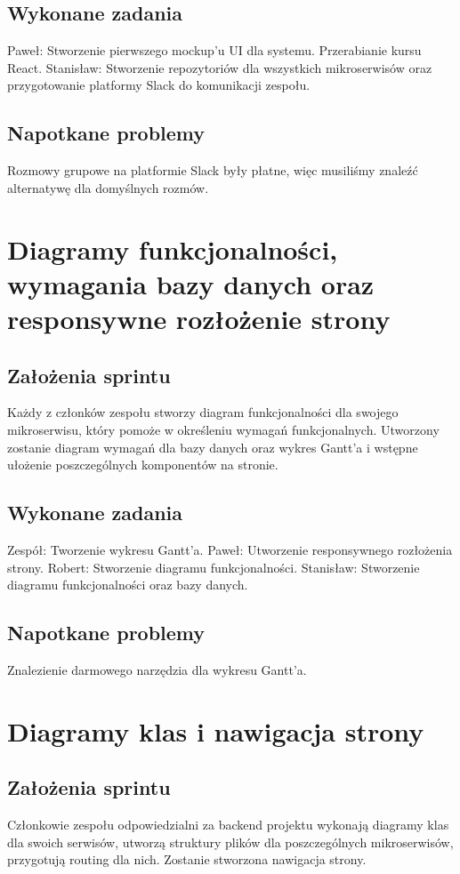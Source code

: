 \documentclass[a4paper,11pt]{report}
\begin{document}
\subsection {Wykonane zadania}
Paweł: Stworzenie pierwszego mockup'u UI dla systemu. Przerabianie kursu React. 
Stanisław: Stworzenie repozytoriów dla wszystkich mikroserwisów oraz przygotowanie platformy Slack do komunikacji zespołu.
\subsection {Napotkane problemy}
Rozmowy grupowe na platformie Slack były płatne, więc musiliśmy znaleźć alternatywę dla domyślnych rozmów.

\section {Diagramy funkcjonalności, wymagania bazy danych oraz responsywne rozłożenie strony}
\subsection {Założenia sprintu}
Każdy z członków zespołu stworzy diagram funkcjonalności dla swojego mikroserwisu, który pomoże w określeniu wymagań funkcjonalnych. Utworzony zostanie diagram wymagań dla bazy danych oraz wykres Gantt’a i wstępne ułożenie poszczególnych komponentów na stronie.
\subsection {Wykonane zadania}
Zespół: Tworzenie wykresu Gantt'a.
Paweł: Utworzenie responsywnego rozłożenia strony. 
Robert: Stworzenie diagramu funkcjonalności. 
Stanisław: Stworzenie diagramu funkcjonalności oraz bazy danych.
\subsection {Napotkane problemy}
Znalezienie darmowego narzędzia dla wykresu Gantt'a.

\section {Diagramy klas i nawigacja strony}
\subsection {Założenia sprintu}
Członkowie zespołu odpowiedzialni za backend projektu wykonają diagramy klas dla swoich serwisów, utworzą struktury plików dla poszczególnych mikroserwisów, przygotują routing dla nich. Zostanie stworzona nawigacja strony.
\end{document}
